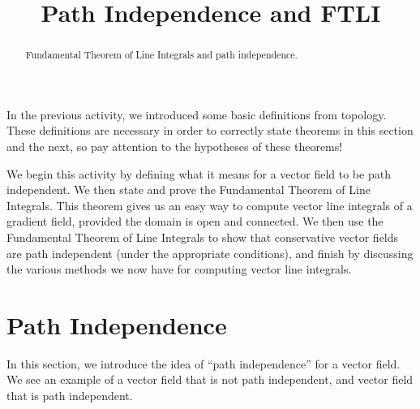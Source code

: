 \documentclass{ximera}
\title{Path Independence and FTLI}
\begin{document}
  
\begin{abstract}  
Fundamental Theorem of Line Integrals and path independence.
\end{abstract}  
\maketitle  

In the previous activity, we introduced some basic definitions from topology. These definitions are necessary in order to correctly state theorems in this section and the next, so pay attention to the hypotheses of these theorems!

We begin this activity by defining what it means for a vector field to be path independent. We then state and prove the Fundamental Theorem of Line Integrals. This theorem gives us an easy way to compute vector line integrals of a gradient field, provided the domain is open and connected. We then use the Fundamental Theorem of Line Integrals to show that conservative vector fields are path independent (under the appropriate conditions), and finish by discussing the various methods we now have for computing vector line integrals.

\section{Path Independence}

In this section, we introduce the idea of ``path independence'' for a vector field. We see an example of a vector field that is not path independent, and vector field that is path independent.
\end{document}
